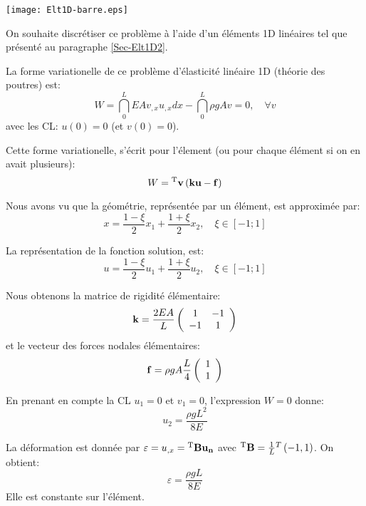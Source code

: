 \centerline{\texttt{[image: Elt1D-barre.eps]}}

On souhaite discrétiser ce problème à l'aide d'un éléments 1D linéaires
tel que présenté au paragraphe \ref{Sec-Elt1D2}.

\medskip
La forme variationelle de ce problème d'élasticité linéaire 1D (théorie des poutres) est:
\begin{equation}
W=\dint_0^L EA v_{,x}u_{,x} dx - \dint_0^L \rho g A v = 0, \quad \forall v
\end{equation}
avec les CL: $u(0)=0$ (et $v(0)=0$).


Cette forme variationelle, s'écrit pour l'élement (ou pour chaque élément si on en avait plusieurs):
\begin{equation}
W = {}^\mathrm{T}\mathbf{v} \left( \mathbf{k}\mathbf{u} - \mathbf{f} \right)
\end{equation}

\medskip
Nous avons vu que la géométrie, représentée par un élément, est approximée par:
\begin{equation} x=\frac{1-\xi}2 x_1 + \frac{1+\xi}2 x_2, \quad \xi\in[-1;1] \end{equation}

La représentation de la fonction solution, est:
\begin{equation} u = \frac{1-\xi}2 u_1 + \frac{1+\xi}2 u_2, \quad \xi\in[-1;1] \end{equation}

\medskip
Nous obtenons la matrice de rigidité élémentaire:
\begin{equation} \mathbf{k} = \frac{2EA}L \left(  \begin{array}{cc} 1 & -1\\ -1& 1 \end{array}\right) \end{equation}
et le vecteur des forces nodales élémentaires:
\begin{equation}  \mathbf{f} = \rho g A \frac{L}4 \left(  \begin{array}{c} 1 \\1 \end{array}\right) \end{equation}

\medskip
En prenant en compte la CL $u_1=0$ et $v_1=0$, l'expression $W=0$ donne:
\begin{equation} u_2 = \frac{\rho g L^2}{8 E} \end{equation}

\medskip
La déformation est donnée par $\varepsilon=u_{,x}={}^\mathrm{T}\mathbf{B}\mathbf{u_n}$ avec ${}^\mathrm{T}\mathbf{B}=\frac1L {}^T\left( -1, 1\right)$.
On obtient: \begin{equation}\varepsilon=\frac{\rho g L}{8 E}\end{equation} Elle est constante sur l'élément.

